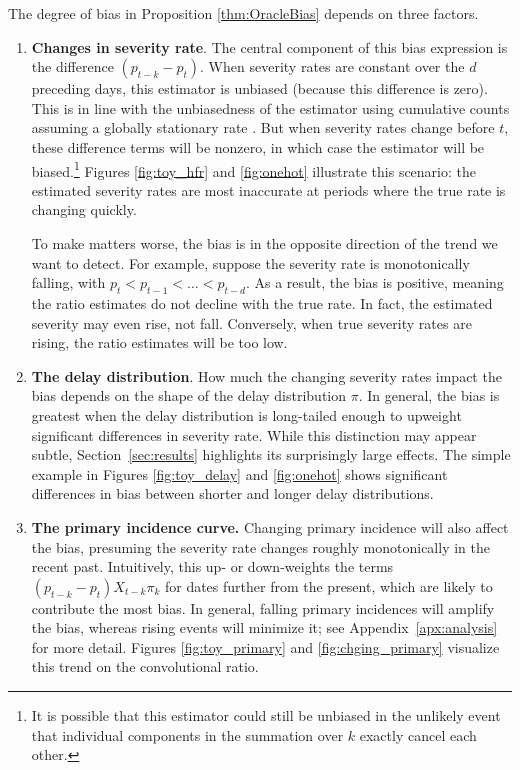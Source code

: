 \documentclass{article}
\begin{document}
The degree of bias in Proposition \ref{thm:OracleBias} depends on three factors.
\begin{enumerate}
    \item \textbf{Changes in severity rate}. The central component of this bias
    expression is the difference $(p_{t-k}-p_t)$. When severity rates are constant over
    the $d$ preceding days, this estimator is unbiased (because this difference
    is zero). This is in line with the
    unbiasedness of the estimator using cumulative counts assuming a globally
    stationary rate \citep{nishiura}. But when severity rates change before $t$,
    these difference terms will be nonzero, in which case the estimator will
    be biased.\footnote{It is possible that this estimator could still be
    unbiased in the unlikely event that individual components in the
    summation over $k$ exactly cancel each other.} 
    Figures \ref{fig:toy_hfr} and \ref{fig:onehot} illustrate this scenario: the estimated severity rates are most inaccurate at periods where the true rate is changing quickly. 

    To make matters worse, the bias is in the opposite direction of the trend we
    want to detect. For example, suppose the severity rate is monotonically falling,
    with $p_{t} < p_{t-1} < \ldots < p_{t-d}$. %
    As a result, the bias is positive, meaning the ratio estimates do not decline with the true rate. In fact, the estimated severity may even rise, not fall. Conversely, when true severity rates are rising, the ratio estimates will be too low. %

    \item \textbf{The delay distribution}. How much the changing severity rates impact the bias depends on the shape of the delay distribution $\pi$. In general, the bias is greatest when the delay distribution is long-tailed enough to upweight significant differences in severity rate. While this distinction may appear subtle, Section~\ref{sec:results} highlights its surprisingly large effects. The simple example in Figures \ref{fig:toy_delay} and \ref{fig:onehot} shows significant differences in bias between shorter and longer delay distributions. 

    \item \textbf{The primary incidence curve.} Changing primary incidence will
    also affect the bias, presuming the severity rate changes roughly
    monotonically in the recent past. Intuitively, this up- or down-weights the
    terms $(p_{t-k} - p_t) X_{t-k}\pi_k$ for dates further from the present,
    which are likely to contribute the most bias. In general, falling primary
    incidences will amplify the bias, whereas rising events will minimize it;
    see Appendix~\ref{apx:analysis} for more detail. Figures
    \ref{fig:toy_primary} and \ref{fig:chging_primary} visualize this trend on
    the convolutional ratio. 
\end{enumerate}
\end{document}

